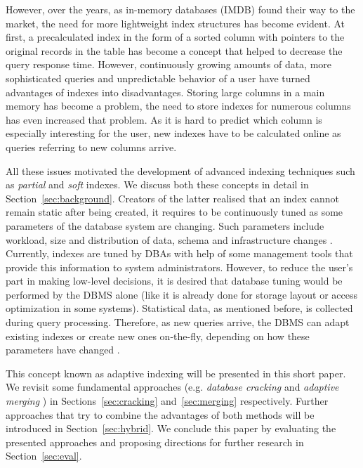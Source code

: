 \documentclass[10pt, conference, compsocconf]{IEEEtran}
\begin{document}
However, over the years, as in-memory databases (IMDB) found their way to the market, the need for more lightweight index structures has become evident. At first, a precalculated index in the form of a sorted column with pointers to the original records in the table has become a concept that helped to decrease the query response time. However, continuously growing amounts of data, more sophisticated queries and unpredictable behavior of a user have turned advantages of indexes into disadvantages\cite{partial2}. Storing large columns in a main memory has become a problem, the need to store indexes for numerous columns has even increased that problem. As it is hard to predict which column is especially interesting for the user, new indexes have to be calculated online as queries referring to new columns arrive.

All these issues motivated the development of advanced indexing techniques such as \emph{partial} \cite{partial1} and \emph{soft} \cite{soft_indexes} indexes. We discuss both these concepts in detail in Section~\ref{sec:background}. Creators of the latter realised that an index cannot remain static after being created, it requires to be continuously tuned as some parameters of the database system are changing. Such parameters include workload, size and distribution of data, schema and infrastructure changes \cite{soft_indexes}. Currently, indexes are tuned by DBAs with help of some management tools that provide this information to system administrators. However, to reduce the user's part in making low-level decisions, it is desired that database tuning would be performed by the DBMS alone (like it is already done for storage layout or access optimization in some systems). Statistical data, as mentioned before, is collected during query processing. Therefore, as new queries arrive, the DBMS can adapt existing indexes or create new ones on-the-fly, depending on how these parameters have changed \cite{soft_indexes}.

This concept known as adaptive indexing will be presented in this short paper. We revisit some fundamental approaches (e.g. \emph{database cracking} \cite{cracking} and \emph{adaptive merging} \cite{merging}) in Sections~\ref{sec:cracking} and~\ref{sec:merging} respectively. Further approaches that try to combine the advantages of both methods will be introduced in Section~\ref{sec:hybrid}. We conclude this paper by evaluating the presented approaches and proposing directions for further research in Section~\ref{sec:eval}.
\end{document}
